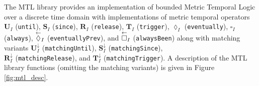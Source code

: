 The MTL library provides an implementation of bounded Metric Temporal Logic
over a discrete time domain with implementations of metric temporal operators
$\mathbf{U}_{I}$ (\verb,until,), $\mathbf{S}_{I}$ ({\tt since}),
$\mathbf{R}_{I}$ ({\tt release}),
$\mathbf{T}_{I}$ (\verb,trigger,), $\lozenge_{I}$ ({\tt eventually}),
$\square_{I}$ (\verb,always,),
$\overset{\leftarrow}{\lozenge}_{I}$ ({\tt eventuallyPrev}), and
$\overset{\leftarrow}{\square}_{I}$ ({\tt alwaysBeen}) along with matching variants
$\mathbf{U}^{\downarrow}_{I}$ ({\tt matchingUntil}),
$\mathbf{S}^{\downarrow}_{I}$ ({\tt matchingSince}),\\
$\mathbf{R}^{\downarrow}_{I}$ ({\tt matchingRelease}),
and $\mathbf{T}^{\downarrow}_{I}$ ({\tt matchingTrigger}).
A description of the MTL library functions (omitting the matching variants)
is given in Figure \ref{fig:mtl_desc}.

